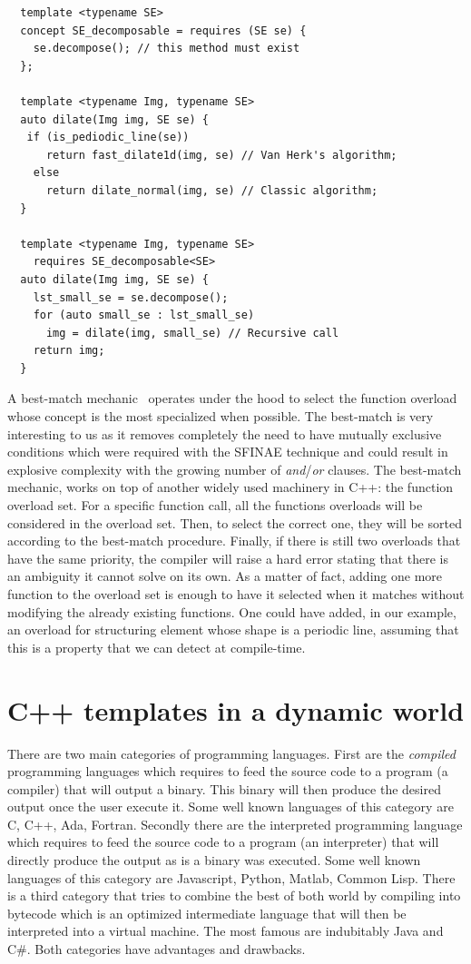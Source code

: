 \begin{verbatim}
  template <typename SE>
  concept SE_decomposable = requires (SE se) {
    se.decompose(); // this method must exist
  };

  template <typename Img, typename SE>
  auto dilate(Img img, SE se) {
   if (is_pediodic_line(se))
      return fast_dilate1d(img, se) // Van Herk's algorithm;
    else
      return dilate_normal(img, se) // Classic algorithm;
  }

  template <typename Img, typename SE>
    requires SE_decomposable<SE>
  auto dilate(Img img, SE se) {
    lst_small_se = se.decompose();
    for (auto small_se : lst_small_se)
      img = dilate(img, small_se) // Recursive call
    return img;
  }
\end{verbatim}
A best-match mechanic~\parencite{dosries.2066.specifying.proc} operates under the hood to select the function overload
whose concept is the most specialized when possible. The best-match is very interesting to us as it removes completely
the need to have mutually exclusive conditions which were required with the SFINAE technique and could result in
explosive complexity with the growing number of \emph{and}/\emph{or} clauses. The best-match mechanic, works on top of
another widely used machinery in C++: the function overload set. For a specific function call, all the functions
overloads will be considered in the overload set. Then, to select the correct one, they will be sorted according to the
best-match procedure. Finally, if there is still two overloads that have the same priority, the compiler will raise a
hard error stating that there is an ambiguity it cannot solve on its own. As a matter of fact, adding one more function
to the overload set is enough to have it selected when it matches without modifying the already existing functions. One
could have added, in our example, an overload for structuring element whose shape is a periodic line, assuming that this
is a property that we can detect at compile-time.

\section{C++ templates in a dynamic world}
\label{sec:template.dynworld}

There are two main categories of programming languages. First are the \emph{compiled} programming languages which
requires to feed the source code to a program (a compiler) that will output a binary. This binary will then produce the
desired output once the user execute it. Some well known languages of this category are C, C++, Ada, Fortran. Secondly
there are the interpreted programming language which requires to feed the source code to a program (an interpreter) that
will directly produce the output as is a binary was executed. Some well known languages of this category are Javascript,
Python, Matlab, Common Lisp. There is a third category that tries to combine the best of both world by compiling into
bytecode which is an optimized intermediate language that will then be interpreted into a virtual machine. The most
famous are indubitably Java and C\#. Both categories have advantages and drawbacks.

